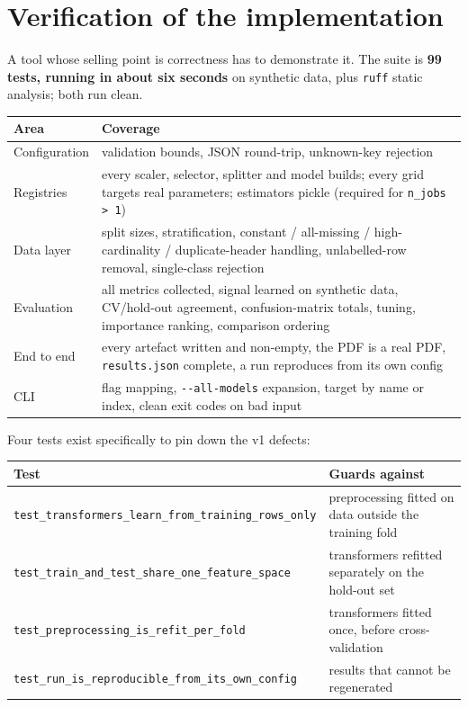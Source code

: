 \documentclass[11pt,a4paper]{article}
\begin{document}
\section{Verification of the implementation}

A tool whose selling point is correctness has to demonstrate it. The suite is
\textbf{99 tests, running in about six seconds} on synthetic data, plus
\texttt{ruff} static analysis; both run clean.

\begin{center}
\begin{tabularx}{\textwidth}{L{2.7cm} X}
\toprule
\textbf{Area} & \textbf{Coverage} \\
\midrule
Configuration & validation bounds, JSON round-trip, unknown-key rejection \\
Registries & every scaler, selector, splitter and model builds; every grid targets real parameters; estimators pickle (required for \texttt{n\_jobs > 1}) \\
Data layer & split sizes, stratification, constant / all-missing / high-cardinality / duplicate-header handling, unlabelled-row removal, single-class rejection \\
Evaluation & all metrics collected, signal learned on synthetic data, CV/hold-out agreement, confusion-matrix totals, tuning, importance ranking, comparison ordering \\
End to end & every artefact written and non-empty, the PDF is a real PDF, \texttt{results.json} complete, a run reproduces from its own config \\
CLI & flag mapping, \texttt{-{}-all-models} expansion, target by name or index, clean exit codes on bad input \\
\bottomrule
\end{tabularx}
\end{center}

Four tests exist specifically to pin down the v1 defects:

\begin{center}
\begin{tabularx}{\textwidth}{L{6.6cm} X}
\toprule
\textbf{Test} & \textbf{Guards against} \\
\midrule
\texttt{test\_transformers\_learn\_from\_\-training\_rows\_only} & preprocessing fitted on data outside the training fold \\
\texttt{test\_train\_and\_test\_share\_\-one\_feature\_space} & transformers refitted separately on the hold-out set \\
\texttt{test\_preprocessing\_is\_refit\_\-per\_fold} & transformers fitted once, before cross-validation \\
\texttt{test\_run\_is\_reproducible\_\-from\_its\_own\_config} & results that cannot be regenerated \\
\bottomrule
\end{tabularx}
\end{center}
\end{document}
